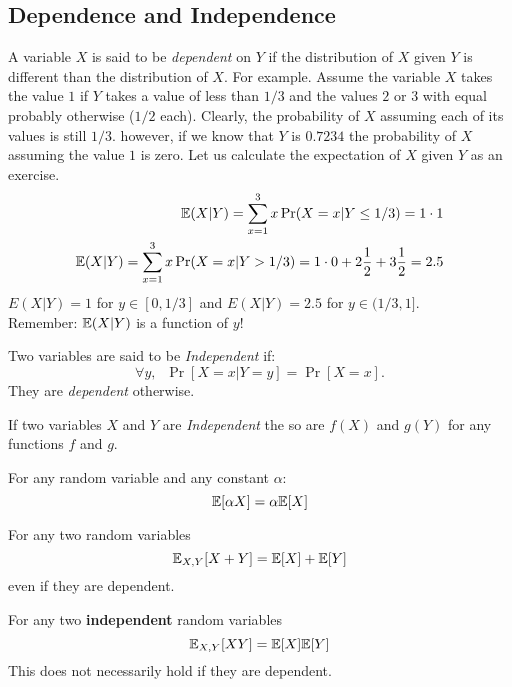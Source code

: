 \documentclass{article}
\begin{document}
\subsection{Dependence and Independence}
A variable $X$ is said to be {\it dependent} on $Y$ if the distribution of $X$ given $Y$ is different than the distribution of $X$. 
For example. Assume the variable $X$ takes the value $1$ if $Y$ takes a
value of less than $1/3$ and the values $2$ or $3$ with equal probably otherwise ($1/2$ each).
%
Clearly, the probability of $X$ assuming each of its values is still
$1/3$. however, if we know that $Y$ is $0.7234$ the probability of
$X$ assuming the value $1$ is zero. Let us calculate the expectation of $X$ given $Y$ as an exercise.
\begin{eqnarray}
{\mathbb E}(X | Y) = \sum_{x=1}^{3} x \Pr(X = x | Y \le 1/3) = 1\cdot 1\\
{\mathbb E}(X | Y) = \sum_{x=1}^{3} x \Pr(X = x | Y > 1/3) = 1\cdot 0 + 2
\frac{1}{2} + 3\frac{1}{2}  = 2.5
\end{eqnarray}
$E(X | Y) = 1$ for $y \in [0,1/3]$ and $E(X | Y) = 2.5$ for $y \in (1/3,1]$.\\
Remember: ${\mathbb E}(X | Y)$ is a function of $y$!

\begin{definition}[Independence]
Two variables are said to be {\it Independent} if:
\[
\forall y,\;\;\Pr[ X=x | Y = y] = \Pr[X=x].
\]
They are {\it dependent} otherwise.
\end{definition}


\begin{fact}
If two variables $X$ and $Y$ are {\it Independent} the so are $f(X)$ and $g(Y)$ for any functions $f$ and $g$.
\end{fact}


\begin{fact}%
For any random variable and any constant $\alpha$:
\begin{equation}
{\mathbb E}[\alpha X] = \alpha {\mathbb E}[X]
\end{equation}
\end{fact}

\begin{fact}%
For any two random variables
\begin{equation}
{\mathbb E}_{X,Y}[X+Y] = {\mathbb E}[X] + {\mathbb E}[Y]
\end{equation}
even if they are dependent.
\end{fact}


\begin{fact}%
For any two {\bf independent} random variables
\begin{equation}
{\mathbb E}_{X,Y}[XY] = {\mathbb E}[X]{\mathbb E}[Y]
\end{equation}
This does not necessarily hold if they are dependent.
\end{fact}
\end{document}
